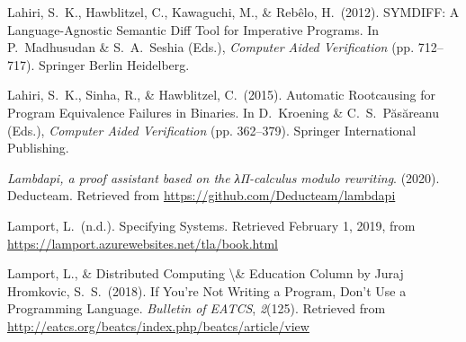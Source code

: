 \documentclass[12pt,twoside]{article}
\begin{document}
{\begin{thebibliography}{1079}
\mdbibitemlabel{}Lahiri, S.~K., Hawblitzel, C., Kawaguchi, M., \& Rebêlo, H.~(2012). SYMDIFF: A Language-Agnostic Semantic Diff Tool for Imperative Programs. In P.~Madhusudan \& S.~A.~Seshia (Eds.), \emph{Computer Aided Verification} (pp. 712–717). Springer Berlin Heidelberg.%

\mdbibitemlabel{}Lahiri, S.~K., Sinha, R., \& Hawblitzel, C.~(2015). Automatic Rootcausing for Program Equivalence Failures in Binaries. In D.~Kroening \& C.~S.~Păsăreanu (Eds.), \emph{Computer Aided Verification} (pp. 362–379). Springer International Publishing.%

\mdbibitemlabel{}\emph{Lambdapi, a proof assistant based on the λΠ-calculus modulo rewriting}. (2020). Deducteam. Retrieved from \href{https://github.com/Deducteam/lambdapi}{{\ttfamily https://\hspace{0pt}github.\hspace{0pt}com/\hspace{0pt}Deducteam/\hspace{0pt}lambdapi}}%

\mdbibitemlabel{}Lamport, L.~(n.d.). Specifying Systems. Retrieved February 1, 2019, from \href{https://lamport.azurewebsites.net/tla/book.html}{{\ttfamily https://\hspace{0pt}lamport.\hspace{0pt}azurewebsites.\hspace{0pt}net/\hspace{0pt}tla/\hspace{0pt}book.\hspace{0pt}html}}%

\mdbibitemlabel{}Lamport, L., \& Distributed Computing \textbackslash{}\& Education Column by Juraj Hromkovic, S.~S.~(2018). If You’re Not Writing a Program, Don’t Use a Programming Language. \emph{Bulletin of EATCS}, \emph{2}(125). Retrieved from \href{http://eatcs.org/beatcs/index.php/beatcs/article/view}{{\ttfamily http://\hspace{0pt}eatcs.\hspace{0pt}org/\hspace{0pt}beatcs/\hspace{0pt}index.\hspace{0pt}php/\hspace{0pt}beatcs/\hspace{0pt}article/\hspace{0pt}view}}%


\end{thebibliography}}
\end{document}
